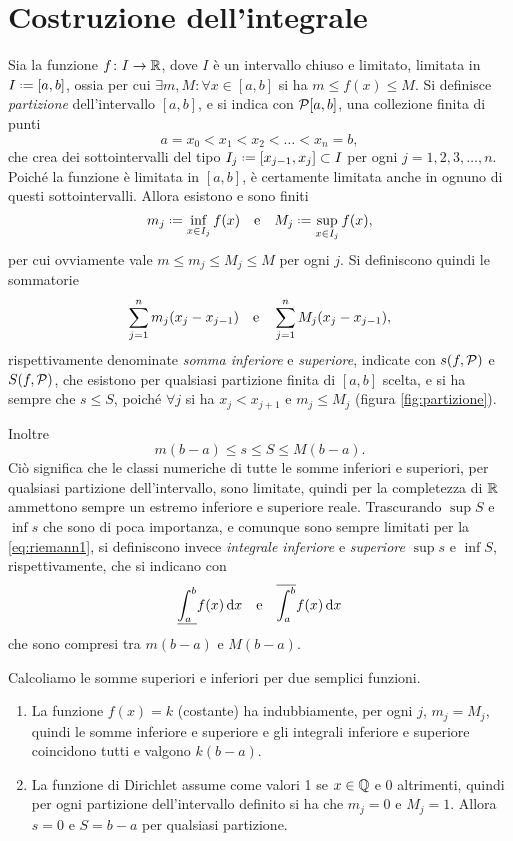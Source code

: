\section{Costruzione dell'integrale}
Sia la funzione $f\colon I\to\mathbb{R}$, dove $I$ è un intervallo chiuso e limitato, limitata in $I\defeq[a,b]$, ossia per cui $\exists m,M\colon\forall x\in [a,b]$ si ha $m\leq f(x)\leq M$.
Si definisce \emph{partizione} dell'intervallo $[a,b]$, e si indica con $\mathcal{P}[a,b]$, una collezione finita di punti
\[
a=x_0<x_1<x_2<\dots<x_n=b,
\]
che crea dei sottointervalli del tipo $I_j\defeq[x_{j-1},x_j]\subset I$ per ogni $j=1,2,3,\dots,n$. Poiché la funzione è limitata in $[a,b]$, è certamente limitata anche in ognuno di questi sottointervalli. Allora esistono e sono finiti
\[
	m_j\defeq\inf_{x\in I_j}f(x)\qtext{e}M_j\defeq\sup_{x\in I_j}f(x),
\]
per cui ovviamente vale $m\leq m_j\leq M_j\leq M$ per ogni $j$.
Si definiscono quindi le sommatorie
\[
\sum_{j=1}^nm_j(x_j-x_{j-1})\quad\text{e}\quad\sum_{j=1}^nM_j(x_j-x_{j-1}),
\]
rispettivamente denominate \emph{somma inferiore} e \emph{superiore}, indicate con $s(f,\mathcal{P})$ e $S(f,\mathcal{P})$, che esistono per qualsiasi partizione finita di $[a,b]$ scelta, e si ha sempre che $s\leq S$, poiché $\forall j$ si ha $x_j<x_{j+1}$ e $m_j\leq M_j$ (figura \ref{fig:partizione}).

Inoltre
\begin{equation} \label{eq:riemann1}
m(b-a)\leq s\leq S\leq M(b-a).
\end{equation}
Ciò significa che le classi numeriche di tutte le somme inferiori e superiori, per qualsiasi partizione dell'intervallo, sono limitate, quindi per la completezza di $\mathbb{R}$ ammettono sempre un estremo inferiore e superiore reale. Trascurando $\sup S$ e $\inf s$ che sono di poca importanza, e comunque sono sempre limitati per la \eqref{eq:riemann1}, si definiscono invece \emph{integrale inferiore} e \emph{superiore} $\sup s$ e $\inf S$, rispettivamente, che si indicano con
\[
\underline{\int_a^b} f(x)\,\textup{d} x\quad\text{e}\quad\overline{\int_a^b} f(x)\,\textup{d} x
\]
che sono compresi tra $m(b-a)$ e $M(b-a)$.
\begin{esempio} \label{es:somme-superiori-inferiori}
	Calcoliamo le somme superiori e inferiori per due semplici funzioni.
	\begin{enumerate}
		\item La funzione $f(x)=k$ (costante) ha indubbiamente, per ogni $j$, $m_j=M_j$, quindi le somme inferiore e superiore e gli integrali inferiore e superiore coincidono tutti e valgono $k(b-a)$.
		\item La funzione di Dirichlet assume come valori 1 se $x\in\mathbb{Q}$ e 0 altrimenti, quindi per ogni partizione dell'intervallo definito si ha che $m_j=0$ e $M_j=1$. Allora $s=0$ e $S=b-a$ per qualsiasi partizione.
	\end{enumerate}
\end{esempio}

